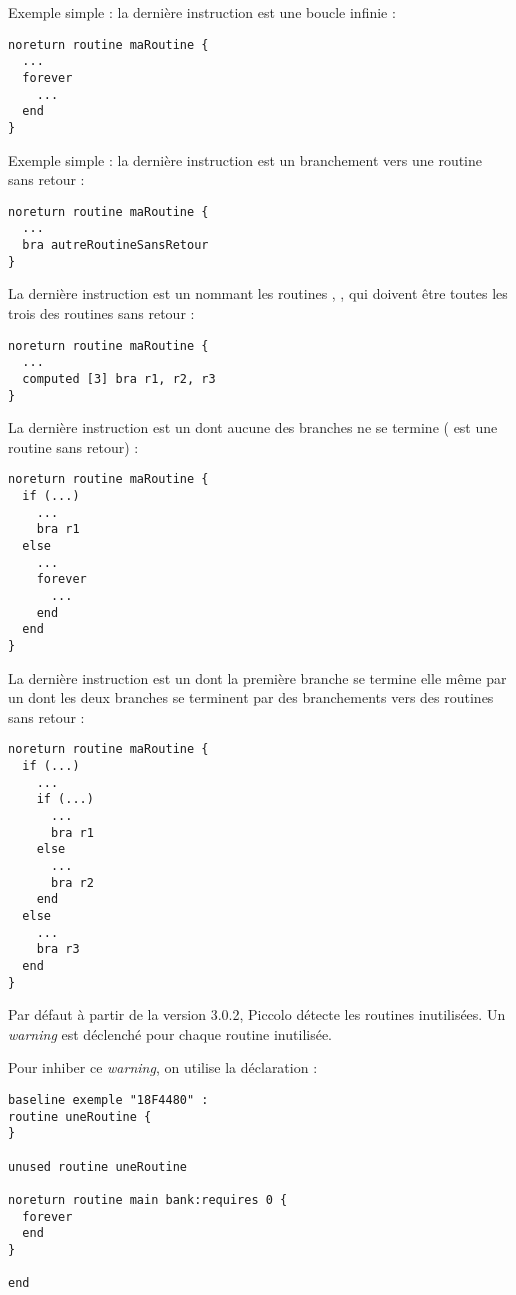 Exemple simple : la dernière instruction est une boucle infinie :
\begin{lstlisting}[language=piccolo]
noreturn routine maRoutine {
  ...
  forever
    ...
  end
}
\end{lstlisting}

Exemple simple : la dernière instruction est un branchement vers une routine sans retour :
\begin{lstlisting}[language=piccolo]
noreturn routine maRoutine {
  ...
  bra autreRoutineSansRetour
}
\end{lstlisting}

La dernière instruction est un  nommant les routines , ,  qui doivent être toutes les trois des routines sans retour :
\begin{lstlisting}[language=piccolo]
noreturn routine maRoutine {
  ...
  computed [3] bra r1, r2, r3
}
\end{lstlisting}

La dernière instruction est un  dont aucune des branches ne se termine ( est une routine sans retour) :
\begin{lstlisting}[language=piccolo]
noreturn routine maRoutine {
  if (...)
    ...
    bra r1
  else
    ...
    forever
      ...
    end
  end
}

\end{lstlisting}


La dernière instruction est un  dont la première branche se termine elle même par un  dont les deux branches se terminent par des branchements vers des routines sans retour :
\begin{lstlisting}[language=piccolo]
noreturn routine maRoutine {
  if (...)
    ...
    if (...)
      ...
      bra r1
    else
      ...
      bra r2
    end
  else
    ...
    bra r3
  end
}
\end{lstlisting}







Par défaut à partir de la version 3.0.2, Piccolo détecte les routines inutilisées. Un \emph{warning} est déclenché pour chaque routine inutilisée.

Pour inhiber ce \emph{warning}, on utilise la déclaration  :

\begin{lstlisting}[language=piccolo]
baseline exemple "18F4480" :
routine uneRoutine {
}

unused routine uneRoutine
 
noreturn routine main bank:requires 0 {
  forever
  end
}

end
\end{lstlisting}


